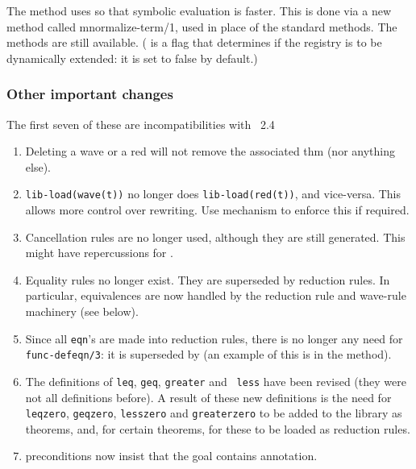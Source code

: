         The  method uses  so that symbolic
evaluation is faster.  This is done via a new method called
m{normalize-term/1}, used in place of the standard 
methods.  The  methods are still available.
( is a flag that determines if the registry is
to be dynamically extended: it is set to false by default.)

\subsubsection* {Other important changes}
The first seven of these are incompatibilities with \clam~2.4
\begin{enumerate}
\item  Deleting a wave or a red will not remove the associated thm
          (nor anything else).
\item  {\tt lib-load(wave(t))} no longer does {\tt lib-load(red(t))}, and
          vice-versa.  This allows more control over rewriting.  Use
 mechanism to enforce this if required.
\item  Cancellation rules are no longer used, although they are still
          generated.  This might have repercussions for
          . 
\item  Equality rules no longer exist.  They are superseded by
          reduction rules.  In particular, equivalences are now
          handled by the reduction rule and wave-rule machinery (see
          below). 
\item  Since all {\tt eqn}'s are made into reduction rules, there is no
          longer any need for {\tt func-defeqn/3}: it is superseded by
           (an example of this is in the 
          method).
\item  The definitions of {\tt leq}, {\tt geq}, {\tt greater} and {\tt
less} have been 
          revised (they were not all definitions before).  A result of
          these new definitions is the need for {\tt  leqzero}, {\tt geqzero},
          {\tt lesszero} and {\tt greaterzero} to be added to the
library as theorems, and, for
          certain theorems, for these to be loaded as reduction rules.
\item  {} preconditions now insist that the goal contains
          annotation.


\end{enumerate}
